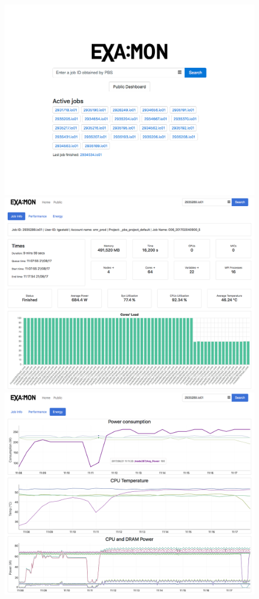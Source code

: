 \documentclass[a4paper, twoside]{article}
\begin{document}
\begin{multicols}{3}
\begin{figure}[b!]
    \includegraphics[width=\columnwidth]{job-lookup}
    \includegraphics[width=\columnwidth]{job-info}
    \includegraphics[width=\columnwidth]{job-energy}

\end{figure}
\end{multicols}
\end{document}
